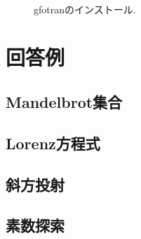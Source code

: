 \documentclass[a4j]{jsarticle}
\begin{document}
\begin{figure}[ht]
\\
\caption{gfotranのインストール.  }
\label{fig_install}
\end{figure}

\clearpage

\section{回答例}

\subsection{Mandelbrot集合}


\subsection{Lorenz方程式}


\subsection{斜方投射}


\subsection{素数探索}


\end{document}
